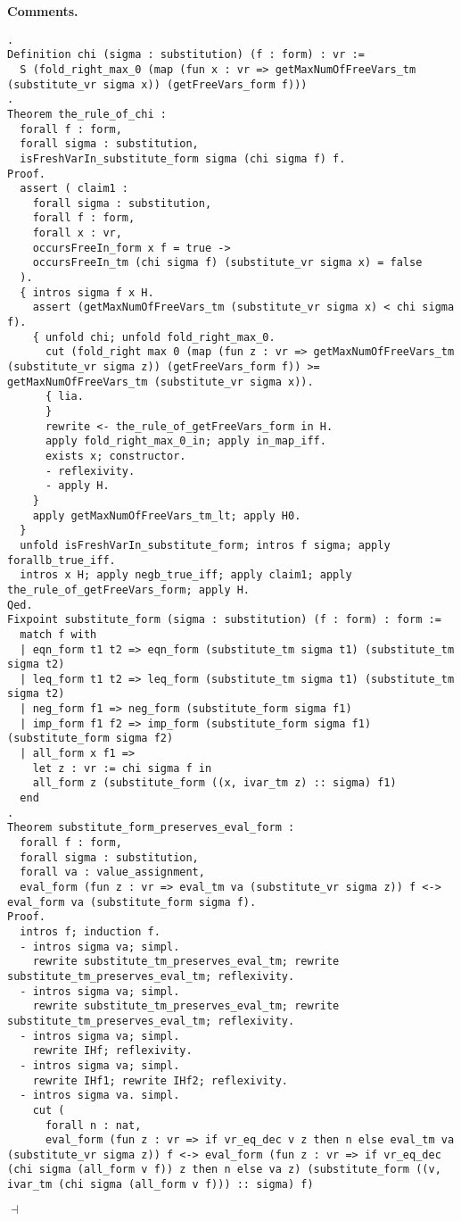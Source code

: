 \documentclass[12pt]{paper}
\newenvironment{context}[1][]{\noindent \textbf{{#1}.}}{\hfill $ \dashv $}
\begin{document}
\begin{context}[Comments]
\begin{lstlisting}[frame=single]
.
Definition chi (sigma : substitution) (f : form) : vr :=
  S (fold_right_max_0 (map (fun x : vr => getMaxNumOfFreeVars_tm (substitute_vr sigma x)) (getFreeVars_form f)))
.
Theorem the_rule_of_chi :
  forall f : form,
  forall sigma : substitution,
  isFreshVarIn_substitute_form sigma (chi sigma f) f.
Proof.
  assert ( claim1 :
    forall sigma : substitution,
    forall f : form,
    forall x : vr,
    occursFreeIn_form x f = true ->
    occursFreeIn_tm (chi sigma f) (substitute_vr sigma x) = false
  ).
  { intros sigma f x H.
    assert (getMaxNumOfFreeVars_tm (substitute_vr sigma x) < chi sigma f).
    { unfold chi; unfold fold_right_max_0.
      cut (fold_right max 0 (map (fun z : vr => getMaxNumOfFreeVars_tm (substitute_vr sigma z)) (getFreeVars_form f)) >= getMaxNumOfFreeVars_tm (substitute_vr sigma x)).
      { lia.
      }
      rewrite <- the_rule_of_getFreeVars_form in H.
      apply fold_right_max_0_in; apply in_map_iff.
      exists x; constructor.
      - reflexivity.
      - apply H.
    }
    apply getMaxNumOfFreeVars_tm_lt; apply H0.
  }
  unfold isFreshVarIn_substitute_form; intros f sigma; apply forallb_true_iff.
  intros x H; apply negb_true_iff; apply claim1; apply the_rule_of_getFreeVars_form; apply H.
Qed.
Fixpoint substitute_form (sigma : substitution) (f : form) : form :=
  match f with
  | eqn_form t1 t2 => eqn_form (substitute_tm sigma t1) (substitute_tm sigma t2)
  | leq_form t1 t2 => leq_form (substitute_tm sigma t1) (substitute_tm sigma t2)
  | neg_form f1 => neg_form (substitute_form sigma f1)
  | imp_form f1 f2 => imp_form (substitute_form sigma f1) (substitute_form sigma f2)
  | all_form x f1 =>
    let z : vr := chi sigma f in
    all_form z (substitute_form ((x, ivar_tm z) :: sigma) f1)
  end
.
Theorem substitute_form_preserves_eval_form :
  forall f : form,
  forall sigma : substitution,
  forall va : value_assignment,
  eval_form (fun z : vr => eval_tm va (substitute_vr sigma z)) f <-> eval_form va (substitute_form sigma f).
Proof.
  intros f; induction f.
  - intros sigma va; simpl.
    rewrite substitute_tm_preserves_eval_tm; rewrite substitute_tm_preserves_eval_tm; reflexivity.
  - intros sigma va; simpl.
    rewrite substitute_tm_preserves_eval_tm; rewrite substitute_tm_preserves_eval_tm; reflexivity.
  - intros sigma va; simpl.
    rewrite IHf; reflexivity.
  - intros sigma va; simpl.
    rewrite IHf1; rewrite IHf2; reflexivity.
  - intros sigma va. simpl.
    cut (
      forall n : nat,
      eval_form (fun z : vr => if vr_eq_dec v z then n else eval_tm va (substitute_vr sigma z)) f <-> eval_form (fun z : vr => if vr_eq_dec (chi sigma (all_form v f)) z then n else va z) (substitute_form ((v, ivar_tm (chi sigma (all_form v f))) :: sigma) f)

\end{lstlisting}
\end{context}
\end{document}
